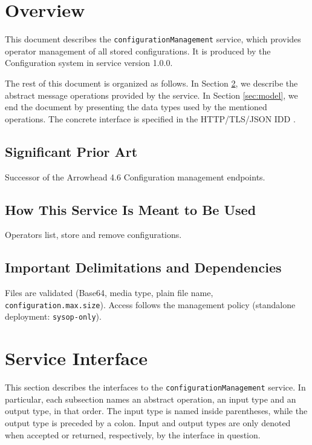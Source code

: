 \documentclass[a4paper]{arrowhead}
\begin{document}
\section{Overview}
\label{sec:overview}

This document describes the \texttt{configuration\allowbreak{}Management} service, which provides operator management of all stored configurations.
It is produced by the Configuration system \cite{cfg-sysd} in service version 1.0.0.

The rest of this document is organized as follows.
In Section \ref{sec:operations}, we describe the abstract message operations provided by the service.
In Section \ref{sec:model}, we end the document by presenting the data types used by the mentioned operations.
The concrete interface is specified in the HTTP/TLS/JSON IDD \cite{cfg-configurationManagement-http-idd}.

\subsection{Significant Prior Art}

Successor of the Arrowhead 4.6 Configuration management endpoints.

\subsection{How This Service Is Meant to Be Used}

Operators list, store and remove configurations.

\subsection{Important Delimitations and Dependencies}
\label{sec:delimitations}

Files are validated (Base64, media type, plain file name, \texttt{configuration.\allowbreak{}max.\allowbreak{}size}). Access follows the management policy (standalone deployment: \texttt{sysop-\allowbreak{}only}).

\newpage

\section{Service Interface}
\label{sec:operations}

This section describes the interfaces to the \texttt{configuration\allowbreak{}Management} service.
In particular, each subsection names an abstract operation, an input type and an output type, in that order.
The input type is named inside parentheses, while the output type is preceded by a colon.
Input and output types are only denoted when accepted or returned, respectively, by the interface in question.
\end{document}
